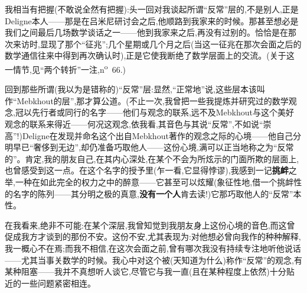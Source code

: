 我相当有把握(不敢说全然有把握):头一回对我谈起所谓“反常”层的,不是别人,正是Deligne本人——那是在吕米尼研讨会之后,他顺路到我家来的时候。那甚至想必是我们之间最后几场数学谈话之一——他到我家来之后,再没有过别的。恰恰是在那次来访时,显现了那个“征兆”;几个星期或几个月之后(当这一征兆在那次会面之后的数学通信往来中得到再次确认时),正是它使我断绝了数学层面上的交流。(关于这一情节,见“两个转折”一注,n\textsuperscript{o}~66.)

回到那些所谓(我以为是错称的)“反常”层:显然,“正常地”说,这些层本该叫作“Mebkhout的层”,那才算公道。(不止一次,我曾把一些我提炼并研究过的数学观念,冠以先行者或同行的名字——他们与观念的联系,远不及Mebkhout与这个美好观念的联系来得近——何况这观念,依我看,其音色与其说“反常”,不如说“崇高”!)Deligne在发现并命名这个出自Mebkhout著作的观念之际的心境——他自己分明早已“奢侈到无边”,却仍准备巧取他人——这份心境,满可以正当地称之为“反常的”。肯定,我的朋友自己,在其内心深处,在某个不会为所炫示的门面所欺的层面上,也曾感受到这一点。在这个名字的授予里(乍一看,它显得悖谬),我感到一记\textbf{挑衅}之举,一种在如此完全的权力之中的醉意——它甚至可以炫耀(象征性地,借一个挑衅性的名字的陈列——其分明之极的真意,\textbf{没有一个人}肯去读!)它那巧取他人的“反常”本性。

\dmark{}在我看来,绝非不可能:在某个深层,我曾知觉到我朋友身上这份心境的音色,而这曾促成我方才谈到的那份不安。这份不安,尤其表现为:对他想必曾向我作的种种解释,我一概心不在焉;而我不相信,在这次会面之前,曾有哪次我没有持续专注地听他说话——尤其当事关数学的时候。我心中对这个被(天知道为什么)称作“反常”的观念,有某种阻塞——我并不真想听人谈它,尽管它与我一直(且在某种程度上依然)十分贴近的一些问题紧密相连。

